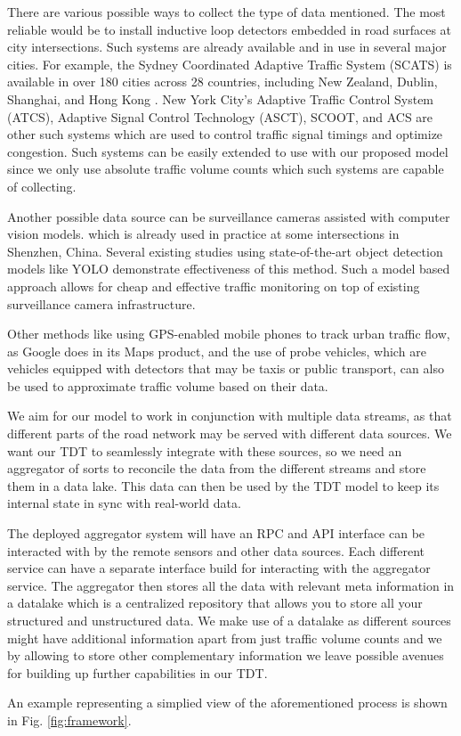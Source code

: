There are various possible ways to collect the type of data mentioned. The most reliable would be to install inductive loop detectors embedded in road surfaces at city intersections. Such systems are already available and in use in several major cities. For example, the Sydney Coordinated Adaptive Traffic System (SCATS)\cite{scats} is available in over 180 cities across 28 countries, including New Zealand, Dublin, Shanghai, and Hong Kong \cite{wiki:sydney_traffic_system}. New York City's Adaptive Traffic Control System (ATCS), Adaptive Signal Control Technology (ASCT), SCOOT, and ACS are other such systems which are used to control traffic signal timings and optimize congestion. Such systems can be easily extended to use with our proposed model since we only use absolute traffic volume counts which such systems are capable of collecting.

Another possible data source can be surveillance cameras assisted with computer vision models\cite{jain2019review}. which is already used in practice at some intersections in Shenzhen, China. Several existing studies\cite{asha2018vehicle} using state-of-the-art object detection models like YOLO\cite{redmon2018yolov3} demonstrate effectiveness of this method. Such a model based approach allows for cheap and effective traffic monitoring on top of existing surveillance camera infrastructure. 

Other methods like using GPS-enabled mobile phones\cite{rose2006mobile} to track urban traffic flow, as Google does in its Maps product, and the use of probe vehicles\cite{zhu2012probe}, which are vehicles equipped with detectors that may be taxis or public transport, can also be used to approximate traffic volume based on their data.

We aim for our model to work in conjunction with multiple data streams, as that different parts of the road network may be served with different data sources. We want our TDT to seamlessly integrate with these sources, so we need an aggregator of sorts to reconcile the data from the different streams and store them in a data lake. This data can then be used by the TDT model to keep its internal state in sync with real-world data.

The deployed aggregator system will have an RPC and API interface can be interacted with by the remote sensors and other data sources. Each different service can have a separate interface build for interacting with the aggregator service. The aggregator then stores all the data with relevant meta information in a datalake which is a centralized repository that allows you to store all your structured and unstructured data. We make use of a datalake as different sources might have additional information apart from just traffic volume counts and we by allowing to store other complementary information we leave possible avenues for building up further capabilities in our TDT.

An example representing a simplied view of the aforementioned process is shown in Fig. \ref{fig:framework}.
